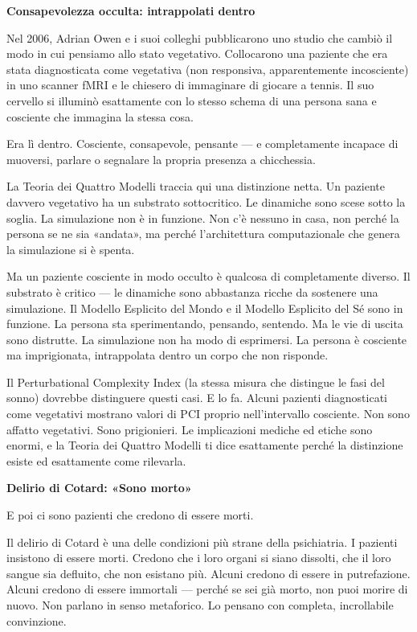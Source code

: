 \documentclass[11pt, twoside, openright]{book}
\begin{document}
\textbf{Consapevolezza occulta: intrappolati dentro}

Nel 2006, Adrian Owen e i suoi colleghi pubblicarono uno studio che cambiò il modo in cui pensiamo allo stato vegetativo. Collocarono una paziente che era stata diagnosticata come vegetativa (non responsiva, apparentemente incosciente) in uno scanner fMRI e le chiesero di immaginare di giocare a tennis. Il suo cervello si illuminò esattamente con lo stesso schema di una persona sana e cosciente che immagina la stessa cosa.

Era lì dentro. Cosciente, consapevole, pensante --- e completamente incapace di muoversi, parlare o segnalare la propria presenza a chicchessia.

La Teoria dei Quattro Modelli traccia qui una distinzione netta. Un paziente davvero vegetativo ha un substrato sottocritico. Le dinamiche sono scese sotto la soglia. La simulazione non è in funzione. Non c'è nessuno in casa, non perché la persona se ne sia «andata», ma perché l'architettura computazionale che genera la simulazione si è spenta.

Ma un paziente cosciente in modo occulto è qualcosa di completamente diverso. Il substrato è critico --- le dinamiche sono abbastanza ricche da sostenere una simulazione. Il Modello Esplicito del Mondo e il Modello Esplicito del Sé sono in funzione. La persona sta sperimentando, pensando, sentendo. Ma le vie di uscita sono distrutte. La simulazione non ha modo di esprimersi. La persona è cosciente ma imprigionata, intrappolata dentro un corpo che non risponde.

Il Perturbational Complexity Index (la stessa misura che distingue le fasi del sonno) dovrebbe distinguere questi casi. E lo fa. Alcuni pazienti diagnosticati come vegetativi mostrano valori di PCI proprio nell'intervallo cosciente. Non sono affatto vegetativi. Sono prigionieri. Le implicazioni mediche ed etiche sono enormi, e la Teoria dei Quattro Modelli ti dice esattamente perché la distinzione esiste ed esattamente come rilevarla.

\textbf{Delirio di Cotard: «Sono morto»}

E poi ci sono pazienti che credono di essere morti.

Il delirio di Cotard è una delle condizioni più strane della psichiatria. I pazienti insistono di essere morti. Credono che i loro organi si siano dissolti, che il loro sangue sia defluito, che non esistano più. Alcuni credono di essere in putrefazione. Alcuni credono di essere immortali --- perché se sei già morto, non puoi morire di nuovo. Non parlano in senso metaforico. Lo pensano con completa, incrollabile convinzione.
\end{document}
